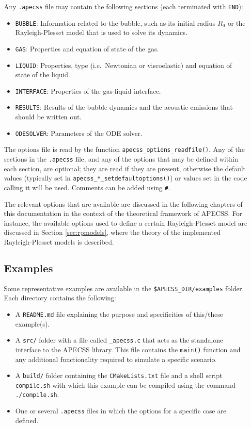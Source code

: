 Any {\tt *.apecss} file may contain the following sections (each terminated with {\tt END}):
\vspace{-1em}
\begin{itemize}[noitemsep]
  \item {\tt BUBBLE}: Information related to the bubble, such as its initial radius $R_0$ or the Rayleigh-Plesset model that is used to solve its dynamics.
  \item {\tt GAS}: Properties and equation of state of the gas.
  \item {\tt LIQUID}: Properties, type (i.e.~Newtonian or viscoelastic) and equation of state of the liquid.
  \item {\tt INTERFACE}: Properties of the gas-liquid interface. 
  \item {\tt RESULTS}: Results of the bubble dynamics and the acoustic emissions that should be written out.
  \item {\tt ODESOLVER}: Parameters of the ODE solver.
\end{itemize}
The options file is read by the function {\tt apecss\_options\_readfile()}. Any of the sections in the {\tt *.apecss} file, and any of the options that may be defined within each section, are optional; they are read if they are present, otherwise the default values (typically set in {\tt apecss\_*\_setdefaultoptions()}) or values set in the code calling it will be used. Comments can be added using {\tt \#}.

The relevant options that are available are discussed in the following chapters of this documentation in the context of the theoretical framework of APECSS. For instance, the available options used to define a certain Rayleigh-Plesset model are discussed in Section \ref{sec:rpmodels}, where the theory of the implemented Rayleigh-Plesset models is described. 

\subsection{Examples}

Some representative examples are available in the {\tt \$APECSS\_DIR/examples} folder. Each directory contains the following:\vspace{-1em}
\begin{itemize}[noitemsep]
  \item A {\tt README.md} file explaining the purpose and specificities of this/these example(s).
  \item A {\tt src/} folder with a file called {\tt *\_apecss.c} that acts as the standalone interface to the APECSS library. This file contains the {\tt main()} function and any additional functionality required to simulate a specific scenario.
  \item A {\tt build/} folder containing the {\tt CMakeLists.txt} file and a shell script {\tt compile.sh} with which this example can be compiled using the command {\tt ./compile.sh}.
  \item One or several {\tt *.apecss} files in which the options for a specific case are defined.
\end{itemize}

